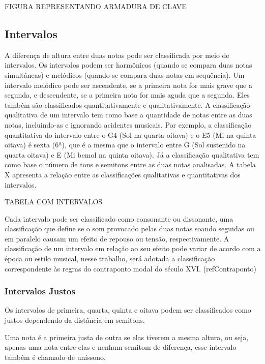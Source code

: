       FIGURA REPRESENTANDO ARMADURA DE CLAVE

    \subsection[Intervalos]{Intervalos}

      A diferença de altura entre duas notas pode ser classificada por meio de intervalos. Os intervalos podem ser harmônicos (quando se compara duas notas simultâneas) e melódicos (quando se compara duas notas em sequência). Um intervalo melódico pode ser ascendente, se a primeira nota for mais grave que a segunda, e descendente, se a primeira nota for mais aguda que a segunda. Eles também são classificados quantitativamente e qualitativamente. A classificação qualitativa de um intervalo tem como base a quantidade de notas entre as duas notas, incluindo-as e ignorando acidentes musicais. Por exemplo, a classificação quantitativa do intervalo entre o G4 (Sol na quarta oitava) e o E5 (Mi na quinta oitava) é sexta (6ª), que é a mesma que o intervalo entre G (Sol sustenido na quarta oitava) e E (Mi bemol na quinta oitava). Já a classificação qualitativa tem como base o número de tons e semitons entre as duas notas analisadas. A tabela X apresenta a relação entre as classificações qualitativas e quantitativas dos intervalos.

      TABELA COM INTERVALOS

      Cada intervalo pode ser classificado como consonante ou dissonante, uma classificação que define se o som provocado pelas duas notas soando seguidas ou em paralelo causam um efeito de repouso ou tensão, respectivamente. A classificação de um intervalo em relação ao seu efeito pode variar de acordo com a época ou estilo musical, nesse trabalho, será adotada a classificação correspondente às regras do contraponto modal do século XVI. (refContraponto)

      \subsubsection[Intervalos Justos]{Intervalos Justos}

        Os intervalos de primeira, quarta, quinta e oitava podem ser classificados como justos dependendo da distância em semitons.

        Uma nota é a primeira justa de outra se elas tiverem a mesma altura, ou seja, apenas uma nota entre elas e nenhum semitom de diferença, esse intervalo também é chamado de uníssono.

